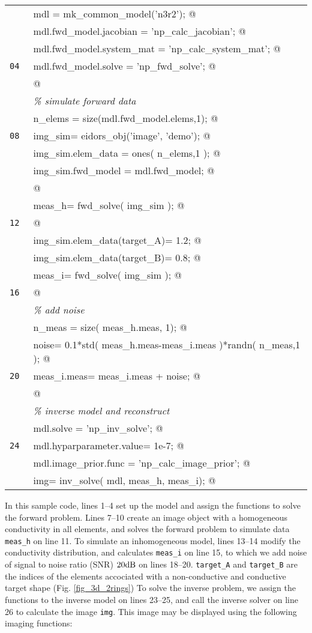 \documentclass[12pt]{iopart}
\makeatletter
\newcommand{\CN}{\tt\small} %
\newcommand{\CC}{&\verb@}   % start code
\newcommand{\CI}{&\it}   % start code
\makeatother
\begin{document}
\begin{tabular}{ll}
\CN    \CC mdl  = mk_common_model('n3r2');   @\\
\CN    \CC mdl.fwd_model.jacobian   = 'np_calc_jacobian';   @\\
\CN    \CC mdl.fwd_model.system_mat = 'np_calc_system_mat';   @\\
\CN 04 \CC mdl.fwd_model.solve      = 'np_fwd_solve';   @\\
\CN    \CC @\\
\CN    \CI \% simulate forward data \\
\CN    \CC n_elems = size(mdl.fwd_model.elems,1);   @\\
\CN 08 \CC img_sim= eidors_obj('image', 'demo');   @\\
\CN    \CC img_sim.elem_data = ones( n_elems,1 );    @\\
\CN    \CC img_sim.fwd_model = mdl.fwd_model;   @\\
\CN    \CC @\\
\CN    \CC meas_h= fwd_solve( img_sim );   @\\
\CN 12 \CC @\\
\CN    \CC img_sim.elem_data(target_A)= 1.2;   @\\
\CN    \CC img_sim.elem_data(target_B)= 0.8;   @\\
\CN    \CC meas_i= fwd_solve( img_sim );   @\\
\CN 16 \CC @\\
\CN    \CI \% add noise \\
\CN    \CC n_meas = size( meas_h.meas, 1); @\\
\CN    \CC noise= 0.1*std( meas_h.meas-meas_i.meas )*randn( n_meas,1 ); @\\
\CN 20 \CC meas_i.meas= meas_i.meas + noise; @\\
\CN    \CC @\\
\CN    \CI \% inverse model and reconstruct\\
\CN    \CC mdl.solve               = 'np_inv_solve'; @\\
\CN 24 \CC mdl.hyparparameter.value= 1e-7; @\\
\CN    \CC mdl.image_prior.func    = 'np_calc_image_prior'; @\\
\CN    \CC img= inv_solve( mdl, meas_h, meas_i); @\\
\end{tabular}

In this sample code, lines 1--4 set up the model and assign
the functions to solve the forward problem.
Lines 7--10 create an image object with a homogeneous
conductivity in all elements, and solves the forward
problem to simulate data {\tt meas\_h} on line 11. To simulate an
inhomogeneous model, lines 13--14 modify the conductivity
distribution, and calculates {\tt meas\_i} on line 15,
to which we add noise of signal to noise ratio (SNR) $20\rm dB$
on lines 18--20.
{\tt target\_A} and {\tt target\_B} are the indices of the 
elements accociated with a non-conductive and conductive
target shape (Fig. \ref{fig_3d_2rings})
To solve the inverse problem, we assign the functions to
the inverse model on lines 23--25, and call the inverse solver
on line 26 to calculate the image {\tt img}. This image
may be displayed using the following imaging functions:
\end{document}
